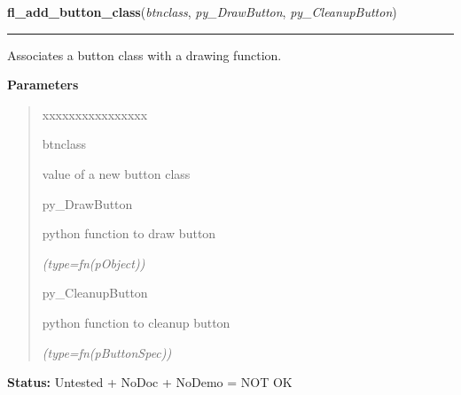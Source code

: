     \label{xformslib:library:fl_add_button_class}

    \vspace{0.5ex}

\hspace{.8\funcindent}\begin{boxedminipage}{\funcwidth}

    \raggedright \textbf{fl\_add\_button\_class}(\textit{btnclass}, \textit{py\_DrawButton}, \textit{py\_CleanupButton})

    \vspace{-1.5ex}

    \rule{\textwidth}{0.5\fboxrule}
\setlength{\parskip}{2ex}
    Associates a button class with a drawing function.

\setlength{\parskip}{1ex}
      \textbf{Parameters}
      \vspace{-1ex}

      \begin{quote}
        \begin{Ventry}{xxxxxxxxxxxxxxxx}

          \item[btnclass]

          value of a new button class

          \item[py\_DrawButton]

          python function to draw button

            {\it (type=fn(pObject))}

          \item[py\_CleanupButton]

          python function to cleanup button

            {\it (type=fn(pButtonSpec))}

        \end{Ventry}

      \end{quote}

\textbf{Status:} Untested + NoDoc + NoDemo = NOT OK



    \end{boxedminipage}

    \label{xformslib:library:fl_set_button_mouse_buttons}

